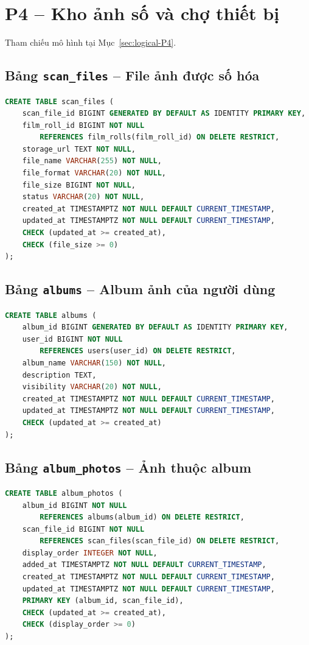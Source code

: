 \section{P4 -- Kho ảnh số và chợ thiết bị}
Tham chiếu mô hình tại Mục~\ref{sec:logical-P4}.
\subsection{Bảng \texttt{scan\_files} -- File ảnh được số hóa}
\label{physical-scan_files}
\begin{lstlisting}[language=SQL,breaklines=true,basicstyle=\ttfamily\scriptsize]
CREATE TABLE scan_files (
    scan_file_id BIGINT GENERATED BY DEFAULT AS IDENTITY PRIMARY KEY,
    film_roll_id BIGINT NOT NULL
        REFERENCES film_rolls(film_roll_id) ON DELETE RESTRICT,
    storage_url TEXT NOT NULL,
    file_name VARCHAR(255) NOT NULL,
    file_format VARCHAR(20) NOT NULL,
    file_size BIGINT NOT NULL,
    status VARCHAR(20) NOT NULL,
    created_at TIMESTAMPTZ NOT NULL DEFAULT CURRENT_TIMESTAMP,
    updated_at TIMESTAMPTZ NOT NULL DEFAULT CURRENT_TIMESTAMP,
    CHECK (updated_at >= created_at),
    CHECK (file_size >= 0)
);
\end{lstlisting}
\subsection{Bảng \texttt{albums} -- Album ảnh của người dùng}
\label{physical-albums}
\begin{lstlisting}[language=SQL,breaklines=true,basicstyle=\ttfamily\scriptsize]
CREATE TABLE albums (
    album_id BIGINT GENERATED BY DEFAULT AS IDENTITY PRIMARY KEY,
    user_id BIGINT NOT NULL
        REFERENCES users(user_id) ON DELETE RESTRICT,
    album_name VARCHAR(150) NOT NULL,
    description TEXT,
    visibility VARCHAR(20) NOT NULL,
    created_at TIMESTAMPTZ NOT NULL DEFAULT CURRENT_TIMESTAMP,
    updated_at TIMESTAMPTZ NOT NULL DEFAULT CURRENT_TIMESTAMP,
    CHECK (updated_at >= created_at)
);
\end{lstlisting}
\subsection{Bảng \texttt{album\_photos} -- Ảnh thuộc album}
\label{physical-album_photos}
\begin{lstlisting}[language=SQL,breaklines=true,basicstyle=\ttfamily\scriptsize]
CREATE TABLE album_photos (
    album_id BIGINT NOT NULL
        REFERENCES albums(album_id) ON DELETE RESTRICT,
    scan_file_id BIGINT NOT NULL
        REFERENCES scan_files(scan_file_id) ON DELETE RESTRICT,
    display_order INTEGER NOT NULL,
    added_at TIMESTAMPTZ NOT NULL DEFAULT CURRENT_TIMESTAMP,
    created_at TIMESTAMPTZ NOT NULL DEFAULT CURRENT_TIMESTAMP,
    updated_at TIMESTAMPTZ NOT NULL DEFAULT CURRENT_TIMESTAMP,
    PRIMARY KEY (album_id, scan_file_id),
    CHECK (updated_at >= created_at),
    CHECK (display_order >= 0)
);
\end{lstlisting}
